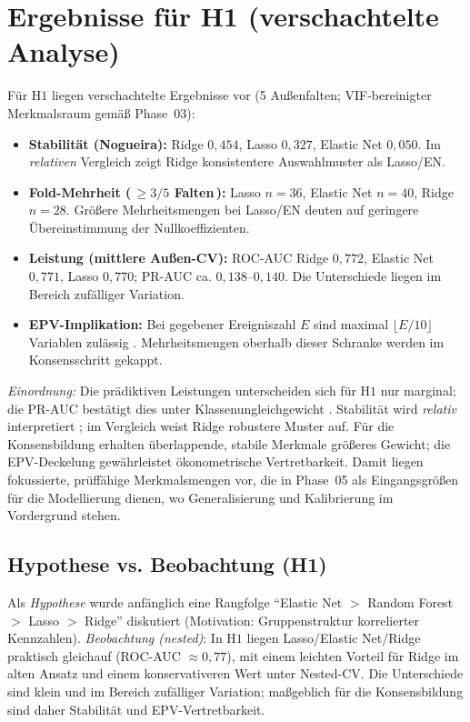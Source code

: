 \section{Ergebnisse für H1 (verschachtelte Analyse)}
Für $\mathrm{H1}$ liegen verschachtelte Ergebnisse vor (5 Außenfalten; VIF-bereinigter Merkmalsraum gemäß Phase~03):
\begin{itemize}
	\item \textbf{Stabilität (Nogueira):} Ridge $0{,}454$, Lasso $0{,}327$, Elastic Net $0{,}050$. Im \emph{relativen} Vergleich zeigt Ridge konsistentere Auswahlmuster als Lasso/EN.
	\item \textbf{Fold-Mehrheit (\,$\geq 3/5$ Falten\,):} Lasso $n=36$, Elastic Net $n=40$, Ridge $n=28$. Größere Mehrheitsmengen bei Lasso/EN deuten auf geringere Übereinstimmung der Nullkoeffizienten.
	\item \textbf{Leistung (mittlere Außen-CV):} ROC-AUC Ridge $0{,}772$, Elastic Net $0{,}771$, Lasso $0{,}770$; PR-AUC ca. $0{,}138$–$0{,}140$. Die Unterschiede liegen im Bereich zufälliger Variation.
	\item \textbf{EPV-Implikation:} Bei gegebener Ereigniszahl $E$ sind maximal $\lfloor E/10 \rfloor$ Variablen zulässig \parencite{peduzzi1996epv,steyerberg2019clinical}. Mehrheitsmengen oberhalb dieser Schranke werden im Konsensschritt gekappt.
\end{itemize}
\noindent
\textit{Einordnung:} Die prädiktiven Leistungen unterscheiden sich für $\mathrm{H1}$ nur marginal; die PR-AUC bestätigt dies unter Klassenungleichgewicht \parencite{saito2015precision}. Stabilität wird \emph{relativ} interpretiert \parencite{nogueira2018stability}; im Vergleich weist Ridge robustere Muster auf. Für die Konsensbildung erhalten überlappende, stabile Merkmale größeres Gewicht; die EPV-Deckelung gewährleistet ökonometrische Vertretbarkeit. Damit liegen fokussierte, prüffähige Merkmalsmengen vor, die in Phase~05 als Eingangsgrößen für die Modellierung dienen, wo Generalisierung und Kalibrierung im Vordergrund stehen.

\subsection*{Hypothese vs. Beobachtung (H1)}
Als \emph{Hypothese} wurde anfänglich eine Rangfolge \enquote{Elastic Net $>$ Random Forest $>$ Lasso $>$ Ridge} diskutiert (Motivation: Gruppenstruktur korrelierter Kennzahlen). \emph{Beobachtung (nested)}: In $\mathrm{H1}$ liegen Lasso/Elastic Net/Ridge praktisch gleichauf (ROC-AUC $\approx 0{,}77$), mit einem leichten Vorteil für Ridge im alten Ansatz und einem konservativeren Wert unter Nested-CV. Die Unterschiede sind klein und im Bereich zufälliger Variation; maßgeblich für die Konsensbildung sind daher Stabilität und EPV-Vertretbarkeit.

